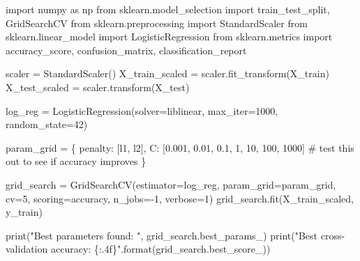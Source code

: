 \documentclass[
  11pt,
  letterpaper,
  DIV=11,
  numbers=noendperiod]{scrartcl}
\newenvironment{Shaded}{\begin{snugshade}}{\end{snugshade}}
\newcommand{\BuiltInTok}[1]{\textcolor[rgb]{0.00,0.23,0.31}{#1}}
\newcommand{\CommentTok}[1]{\textcolor[rgb]{0.37,0.37,0.37}{#1}}
\newcommand{\DecValTok}[1]{\textcolor[rgb]{0.68,0.00,0.00}{#1}}
\newcommand{\FloatTok}[1]{\textcolor[rgb]{0.68,0.00,0.00}{#1}}
\newcommand{\ImportTok}[1]{\textcolor[rgb]{0.00,0.46,0.62}{#1}}
\newcommand{\NormalTok}[1]{\textcolor[rgb]{0.00,0.23,0.31}{#1}}
\newcommand{\OperatorTok}[1]{\textcolor[rgb]{0.37,0.37,0.37}{#1}}
\newcommand{\SpecialCharTok}[1]{\textcolor[rgb]{0.37,0.37,0.37}{#1}}
\newcommand{\StringTok}[1]{\textcolor[rgb]{0.13,0.47,0.30}{#1}}
\begin{document}
\begin{Shaded}
\begin{Highlighting}[]

\ImportTok{import}\NormalTok{ numpy }\ImportTok{as}\NormalTok{ np}
\ImportTok{from}\NormalTok{ sklearn.model\_selection }\ImportTok{import}\NormalTok{ train\_test\_split, GridSearchCV}
\ImportTok{from}\NormalTok{ sklearn.preprocessing }\ImportTok{import}\NormalTok{ StandardScaler}
\ImportTok{from}\NormalTok{ sklearn.linear\_model }\ImportTok{import}\NormalTok{ LogisticRegression}
\ImportTok{from}\NormalTok{ sklearn.metrics }\ImportTok{import}\NormalTok{ accuracy\_score, confusion\_matrix, classification\_report}

\NormalTok{scaler }\OperatorTok{=}\NormalTok{ StandardScaler()}
\NormalTok{X\_train\_scaled }\OperatorTok{=}\NormalTok{ scaler.fit\_transform(X\_train)}
\NormalTok{X\_test\_scaled }\OperatorTok{=}\NormalTok{ scaler.transform(X\_test)}

\NormalTok{log\_reg }\OperatorTok{=}\NormalTok{ LogisticRegression(solver}\OperatorTok{=}\StringTok{\textquotesingle{}liblinear\textquotesingle{}}\NormalTok{, max\_iter}\OperatorTok{=}\DecValTok{1000}\NormalTok{, random\_state}\OperatorTok{=}\DecValTok{42}\NormalTok{)}

\NormalTok{param\_grid }\OperatorTok{=}\NormalTok{ \{}
    \StringTok{\textquotesingle{}penalty\textquotesingle{}}\NormalTok{: [}\StringTok{\textquotesingle{}l1\textquotesingle{}}\NormalTok{, }\StringTok{\textquotesingle{}l2\textquotesingle{}}\NormalTok{],}
    \StringTok{\textquotesingle{}C\textquotesingle{}}\NormalTok{: [}\FloatTok{0.001}\NormalTok{, }\FloatTok{0.01}\NormalTok{, }\FloatTok{0.1}\NormalTok{, }\DecValTok{1}\NormalTok{, }\DecValTok{10}\NormalTok{, }\DecValTok{100}\NormalTok{, }\DecValTok{1000}\NormalTok{] }\CommentTok{\# test this out to see if accuracy improves}
\NormalTok{\}}

\NormalTok{grid\_search }\OperatorTok{=}\NormalTok{ GridSearchCV(estimator}\OperatorTok{=}\NormalTok{log\_reg, param\_grid}\OperatorTok{=}\NormalTok{param\_grid, cv}\OperatorTok{=}\DecValTok{5}\NormalTok{, scoring}\OperatorTok{=}\StringTok{\textquotesingle{}accuracy\textquotesingle{}}\NormalTok{, n\_jobs}\OperatorTok{={-}}\DecValTok{1}\NormalTok{, verbose}\OperatorTok{=}\DecValTok{1}\NormalTok{)}
\NormalTok{grid\_search.fit(X\_train\_scaled, y\_train)}

\BuiltInTok{print}\NormalTok{(}\StringTok{"Best parameters found: "}\NormalTok{, grid\_search.best\_params\_)}
\BuiltInTok{print}\NormalTok{(}\StringTok{"Best cross{-}validation accuracy: }\SpecialCharTok{\{:.4f\}}\StringTok{"}\NormalTok{.}\BuiltInTok{format}\NormalTok{(grid\_search.best\_score\_))}


\end{Highlighting}
\end{Shaded}
\end{document}
